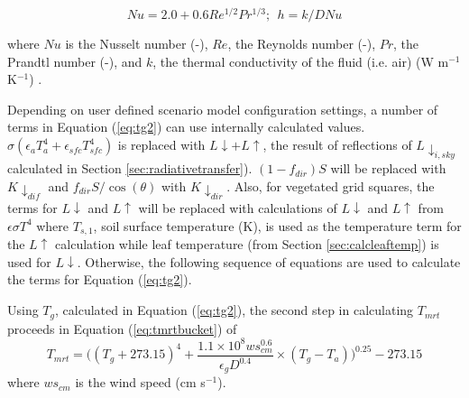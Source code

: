 \documentclass[final,3p,times,authoryear]{elsarticle}
\begin{document}
\begin{equation}\label{eq:h}
Nu = 2.0 + 0.6Re^{1/2}Pr^{1/3};  ~~h = k / D Nu
\end{equation}

where $Nu$ is the Nusselt number (-),
$Re$, the Reynolds number (-),
$Pr$, the Prandtl number (-), and 
$k$, the thermal conductivity of the fluid (i.e. air) (W m$^{-1}$K$^{-1}$) \citep{Liljegren2008}.



Depending on user defined scenario model configuration settings, a number of terms in Equation (\ref{eq:tg2}) can use internally calculated values. $\sigma(\epsilon_{a} T_{a}^{4} + \epsilon_{sfc} T_{sfc}^{4} )$ is replaced with $L\downarrow + L\uparrow$, the result of reflections of $L \downarrow_{i,sky}$ calculated in Section \ref{sec:radiativetransfer}). $(1-f_{dir})S$ will be replaced with $K \downarrow_{dif}$ and $f_{dir}S/ \cos(\theta)$ with $K \downarrow_{dir}$. Also, for vegetated grid squares, the terms for $L\downarrow$ and $L\uparrow$ will be replaced with calculations of $L\downarrow$ and $L\uparrow$ from $\epsilon \sigma T^{4}$ where $T_{s,1}$, soil surface temperature (K), is used as the temperature term for the $L\uparrow$ calculation while leaf temperature (from Section \ref{sec:calcleaftemp}) is used for $L\downarrow$. Otherwise, the following sequence of equations are used to calculate the terms for Equation (\ref{eq:tg2}).

Using $T_{g}$, calculated in Equation (\ref{eq:tg2}), the second step in calculating $T_{mrt}$ proceeds in Equation (\ref{eq:tmrtbucket}) of \cite{Kantor2011}
\begin{equation}\label{eq:tmrtbucket}
  T_{mrt} = 
  \bigg(
   (T_{g}+273.15)^{4} + 
    \frac{1.1 \times 10^{8}  ws_{cm}^{0.6}}{\epsilon_{g}  D^{0.4}}
    \times 
     (T_{g}-T_{a})
    \bigg)^{0.25} - 273.15
\end{equation}
 where $ws_{cm}$ is the wind speed (cm s$^{-1}$).
\end{document}
